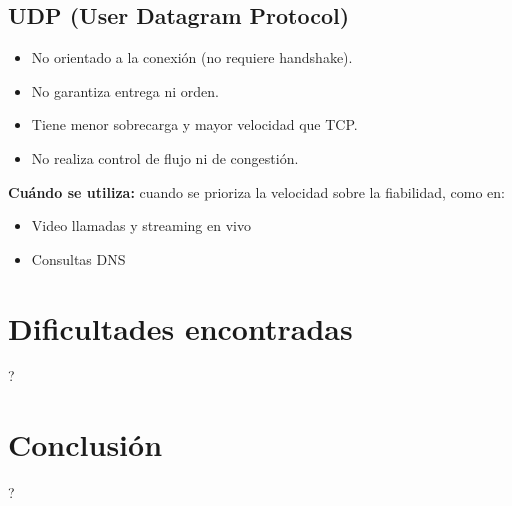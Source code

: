 \documentclass[a4paper,10pt]{article}
\begin{document}
\subsection*{UDP (User Datagram Protocol)}

\begin{itemize}
    \item No orientado a la conexión (no requiere handshake).
    \item No garantiza entrega ni orden.
    \item Tiene menor sobrecarga y mayor velocidad que TCP.
    \item No realiza control de flujo ni de congestión.
\end{itemize}

\textbf{Cuándo se utiliza:} cuando se prioriza la velocidad sobre la fiabilidad, como en:
\begin{itemize}
    \item Video llamadas y streaming en vivo
    \item Consultas DNS
\end{itemize}


\section{Dificultades encontradas}
?

\section{Conclusión}
?
\end{document}
